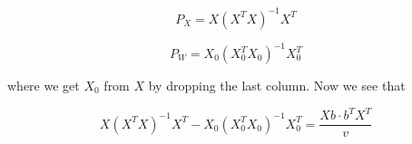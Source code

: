 \documentclass{article}
\begin{document}
\begin{appendices}
\begin{equation}
    P_X = X (X^TX)^{-1} X^T
\end{equation}

\begin{equation}
    P_W = X_0 (X^T_0 X_0)^{-1} X^T_0
\end{equation}

where we get $X_0$ from $X$ by dropping the last column. Now we see that

\begin{equation}
    X (X^TX)^{-1} X^T - X_0 (X^T_0 X_0)^{-1} X^T_0 = \frac{Xb\cdot b^TX^T}{v}
\end{equation}

\end{appendices}
\end{document}
